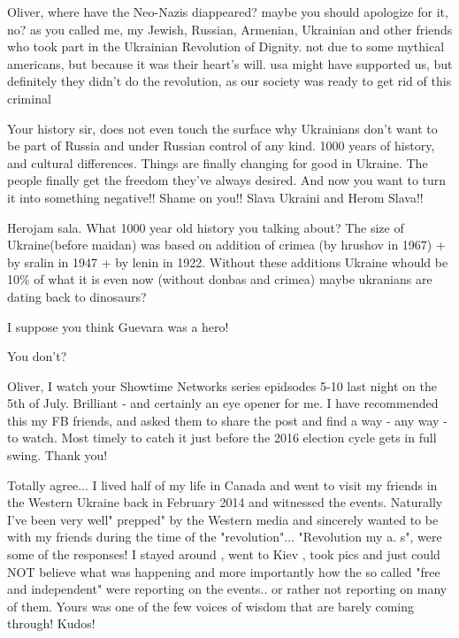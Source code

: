 \begin{itemize}

Oliver, where have the Neo-Nazis diappeared? maybe you should apologize for it,
no? as you called me, my Jewish, Russian, Armenian, Ukrainian and other friends
who took part in the Ukrainian Revolution of Dignity. not due to some mythical
americans, but because it was their heart's will. usa might have supported us,
but definitely they didn't do the revolution, as our society was ready to get
rid of this criminal


Your history sir, does not even touch the surface why Ukrainians don't want to
be part of Russia and under Russian control of any kind. 1000 years of history,
and cultural differences. Things are finally changing for good in Ukraine. The
people finally get the freedom they've always desired. And now you want to turn
it into something negative!! Shame on you!! Slava Ukraini and Herom Slava!!

\begin{itemize} %

Herojam sala. What 1000 year old history you talking about? The size of
Ukraine(before maidan) was based on addition of crimea (by hrushov in 1967) +
by sralin in 1947 + by lenin in 1922. Without these additions Ukraine whould be
10\% of what it is even now (without donbas and crimea) maybe ukranians are
dating back to dinosaurs?

\end{itemize} %

I suppose you think Guevara was a hero!

\begin{itemize} %
You don't?
\end{itemize} %


Oliver, I watch your Showtime Networks series epidsodes 5-10 last night on the
5th of July. Brilliant - and certainly an eye opener for me. I have recommended
this my FB friends, and asked them to share the post and find a way - any way -
to watch. Most timely to catch it just before the 2016 election cycle gets in
full swing. Thank you!



Totally agree... I lived half of my life in Canada and went to visit my friends
in the Western Ukraine back in February 2014 and witnessed the events.
Naturally I've been very well" prepped" by the Western media and sincerely
wanted to be with my friends during the time of the "revolution"... "Revolution
my a. s", were some of the responses! I stayed around , went to Kiev , took pics
and just could NOT believe what was happening and more importantly how the so
called "free and independent" were reporting on the events.. or rather not
reporting on many of them. Yours was one of the few voices of wisdom that are
barely coming through! Kudos!



\end{itemize}
